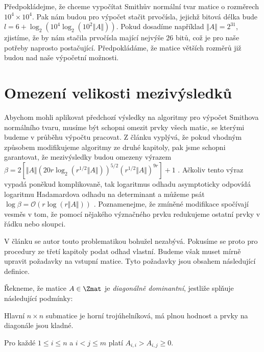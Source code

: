 Předpokládejme, že chceme vypočítat Smithův normální tvar matice o rozměrech
$ 10^4 \times 10^4 $. Pak nám budou pro výpočet stačit prvočísla, jejichž bitová
délka bude $ l = 6 + \log_2(10^4 \log_2(10^2 \Vert A \Vert)) $. Pokud dosadíme
například $ \Vert A \Vert = 2^{31} $, zjistíme, že by nám stačila prvočísla
mající nejvýše $ 26 $ bitů, což je pro naše potřeby naprosto
postačující. Předpokládáme, že matice větších rozměrů již budou nad naše výpočetní
možnosti.



\section{Omezení velikosti mezivýsledků}
Abychom mohli aplikovat předchozí výsledky na algoritmy pro výpočet Smithova
normálního tvaru, musíme být schopni omezit prvky všech matic, se kterými
budeme v průběhu výpočtu pracovat. Z článku \cite{triang} vyplývá, že pokud
vhodným způsobem modifikujeme algoritmy ze druhé kapitoly, pak jsme schopni
garantovat, že mezivýsledky budou omezeny výrazem
$ \beta = 2[\Vert A \Vert (20 r \log_2{ (r^{1/2} \Vert A \Vert) })^{5/2} (r^{1/2} \Vert A \Vert)^{9 r} ] + 1 $
\cite[Theorem 16]{triang}.
Ačkoliv tento výraz vypadá poněkud komplikovaně, tak logaritmus odhadu
asymptoticky odpovídá logaritmu Hadamardova odhadu na determinant a můžeme psát
$ \log{\beta} = \mathcal{O}(r \log{(r \Vert A \Vert)}) $ \cite[Theorem 16]{triang}.
Poznamenejme, že zmíněné modifikace spočívají vesměs v tom, že pomocí nějakého
význačného prvku redukujeme ostatní prvky v řádku nebo sloupci.

V článku \cite{SNF_Arne} se autor touto problematikou bohužel nezabývá. Pokusíme
se proto pro procedury ze třetí kapitoly podat odhad vlastní. Budeme však muset
mírně upravit požadavky na vstupní matice. Tyto požadavky jsou obsahem následující
definice.

\begin{defi}
    Řekneme, že matice $ A \in \Zmat $ je \emph{diagonálně dominantní}, jestliže
    splňuje následující podmínky:
    \begin{Cond}
        \item Hlavní $ n \times n $ submatice je horní trojúhelníková, má plnou
            hodnost a prvky na diagonále jsou kladné.
        \item Pro každé $ 1 \leq i \leq n $ a $ i < j \leq m $ platí 
            $ A_{i, i} > A_{i, j} \geq 0 $.
    \end{Cond}
\end{defi}


